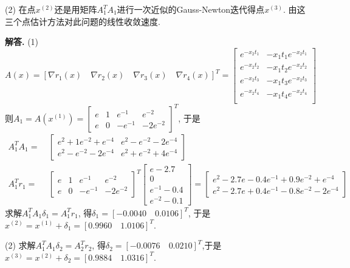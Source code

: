 \documentclass[12pt, a4paper, oneside]{ctexart}
\newenvironment{solution}{\par\noindent\textbf{解答. }}{\bigskip\par}
\def\e{\mathrm{e}}      %
\begin{document}
(2) 在点$x^{(2)}$还是用矩阵$A_1^TA_1$进行一次近似的Gauss-Newton迭代得点$x^{(3)}$. 由这三个点估计方法对此问题的线性收敛速度.
\begin{solution}
    (1) \begin{equation*}
        A(x) = [\nabla r_1(x)\quad\nabla r_2(x)\quad\nabla r_3(x)\quad\nabla r_4(x)]^T = \left[\begin{matrix}
            e^{-x_2t_1}&-x_1t_1e^{-x_2t_1}\\
            e^{-x_2t_2}&-x_1t_2e^{-x_2t_2}\\
            e^{-x_2t_3}&-x_1t_3e^{-x_2t_3}\\
            e^{-x_2t_4}&-x_1t_4e^{-x_2t_4}\\
        \end{matrix}\right]
    \end{equation*}
    则$A_1 = A(x^{(1)}) = \left[\begin{matrix}
        e&1&e^{-1}&e^{-2}\\
        e&0&-e^{-1}&-2e^{-2}
    \end{matrix}\right]^T$, 于是
    \begin{equation*}
        \begin{aligned}
        A_1^TA_1 =&\ \left[\begin{matrix}
            e^2+1e^{-2}+e^{-4}&e^2-e^{-2}-2e^{-4}\\
            e^2-e^{-2}-2e^{-4}&e^2+e^{-2}+4e^{-4}
        \end{matrix}\right]\\
        A_1^Tr_1 =&\ \left[\begin{matrix}
        e&1&e^{-1}&e^{-2}\\
        e&0&-e^{-1}&-2e^{-2}
    \end{matrix}\right]^T\left[\begin{matrix}
        e-2.7\\0\\e^{-1}-0.4\\e^{-2}-0.1
    \end{matrix}\right]=\left[\begin{matrix}
        e^2-2.7e-0.4e^{-1}+0.9e^{-2}+e^{-4}\\
        e^2-2.7e+0.4e^{-1}-0.8e^{-2}-2e^{-4}
    \end{matrix}\right]
        \end{aligned}
    \end{equation*}
    求解$A_1^TA_1\delta_1 = A_1^Tr_1$, 得$\delta_1 = [-0.0040\quad 0.0106]^T$, 于是$x^{(2)} = x^{(1)}+\delta_1 = [0.9960\quad 1.0106]^T$.

    (2) 求解$A_1^TA_1\delta_2 = A_2^Tr_2$, 得$\delta_2 = [-0.0076\quad 0.0210]^T$,于是$x^{(3)} = x^{(2)} +\delta_2 = [0.9884\quad 1.0316]^T$.
\end{solution}
\end{document}
